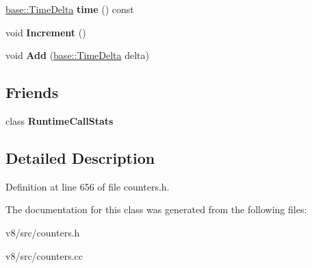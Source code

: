 \begin{DoxyCompactItemize}
\item 
\mbox{\label{classv8_1_1internal_1_1RuntimeCallCounter_aa99f6280e0ffc577c15b50d1619cf567}} 
\mbox{\hyperlink{classv8_1_1base_1_1TimeDelta}{base\+::\+Time\+Delta}} {\bfseries time} () const
\item 
\mbox{\label{classv8_1_1internal_1_1RuntimeCallCounter_a917668c08bc5ae20336fe6fa0e0bb339}} 
void {\bfseries Increment} ()
\item 
\mbox{\label{classv8_1_1internal_1_1RuntimeCallCounter_aefcce919931873d73c67587d5452ebd1}} 
void {\bfseries Add} (\mbox{\hyperlink{classv8_1_1base_1_1TimeDelta}{base\+::\+Time\+Delta}} delta)
\end{DoxyCompactItemize}
\subsection*{Friends}
\begin{DoxyCompactItemize}
\item 
\mbox{\label{classv8_1_1internal_1_1RuntimeCallCounter_ac05b5fe0ce456776c3ccd6d56fe99789}} 
class {\bfseries Runtime\+Call\+Stats}
\end{DoxyCompactItemize}


\subsection{Detailed Description}


Definition at line 656 of file counters.\+h.



The documentation for this class was generated from the following files\+:\begin{DoxyCompactItemize}
\item 
v8/src/counters.\+h\item 
v8/src/counters.\+cc\end{DoxyCompactItemize}
